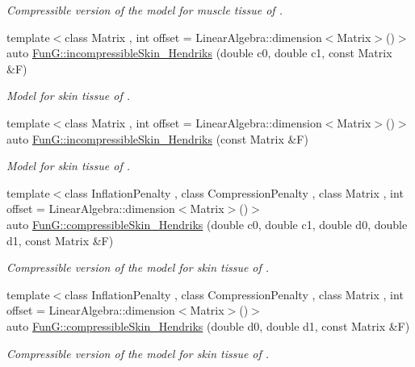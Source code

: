 \begin{DoxyCompactItemize}
\begin{DoxyCompactList}\small\item\em Compressible version of the model for muscle tissue of \cite{Martins1998}. \end{DoxyCompactList}\item 
{\footnotesize template$<$class Matrix , int offset = Linear\-Algebra\-::dimension$<$\-Matrix$>$()$>$ }\\auto \hyperlink{group__Biomechanics_gaa20bf15ef6976d64d89490429035b2c4}{Fun\-G\-::incompressible\-Skin\-\_\-\-Hendriks} (double c0, double c1, const Matrix \&F)
\begin{DoxyCompactList}\small\item\em Model for skin tissue of \cite{Hendriks2005}. \end{DoxyCompactList}\item 
{\footnotesize template$<$class Matrix , int offset = Linear\-Algebra\-::dimension$<$\-Matrix$>$()$>$ }\\auto \hyperlink{group__Biomechanics_gad8653218bd2afb4e3cfd601a5142956c}{Fun\-G\-::incompressible\-Skin\-\_\-\-Hendriks} (const Matrix \&F)
\begin{DoxyCompactList}\small\item\em Model for skin tissue of \cite{Hendriks2005}. \end{DoxyCompactList}\item 
{\footnotesize template$<$class Inflation\-Penalty , class Compression\-Penalty , class Matrix , int offset = Linear\-Algebra\-::dimension$<$\-Matrix$>$()$>$ }\\auto \hyperlink{group__Biomechanics_ga07b4c52c6ecf7e72f73ab5832fb262cd}{Fun\-G\-::compressible\-Skin\-\_\-\-Hendriks} (double c0, double c1, double d0, double d1, const Matrix \&F)
\begin{DoxyCompactList}\small\item\em Compressible version of the model for skin tissue of \cite{Hendriks2005}. \end{DoxyCompactList}\item 
{\footnotesize template$<$class Inflation\-Penalty , class Compression\-Penalty , class Matrix , int offset = Linear\-Algebra\-::dimension$<$\-Matrix$>$()$>$ }\\auto \hyperlink{group__Biomechanics_ga42721e772b7eada1b0bca98247ad440f}{Fun\-G\-::compressible\-Skin\-\_\-\-Hendriks} (double d0, double d1, const Matrix \&F)
\begin{DoxyCompactList}\small\item\em Compressible version of the model for skin tissue of \cite{Hendriks2005}. \end{DoxyCompactList}\end{DoxyCompactItemize}


